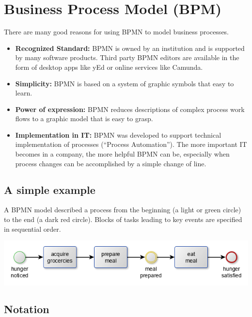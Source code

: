 \documentclass[]{book}
\providecommand{\tightlist}{%
  \setlength{\itemsep}{0pt}\setlength{\parskip}{0pt}}
\begin{document}
\hypertarget{business-process-model-bpm}{%
\section{Business Process Model (BPM)}\label{business-process-model-bpm}}

There are many good reasons for using BPMN to model business processes. \citep{Camunda2018a}

\begin{itemize}
\tightlist
\item
  \textbf{Recognized Standard:} BPMN is owned by an institution and is supported by many software products. Third party BPMN editors are available in the form of desktop apps like yEd \citep{YED2018} or online services like Camunda. \citep{Camunda2018b}
\item
  \textbf{Simplicity:} BPMN is based on a system of graphic symbols that easy to learn.
\item
  \textbf{Power of expression:} BPMN reduces descriptions of complex process work flows to a graphic model that is easy to grasp.
\item
  \textbf{Implementation in IT:} BPMN was developed to support technical implementation of processes (``Process Automation''). The more important IT becomes in a company, the more helpful BPMN can be, especially when process changes can be accomplished by a simple change of line.
\end{itemize}

\hypertarget{a-simple-example}{%
\subsection{A simple example}\label{a-simple-example}}

A BPMN model described a process from the beginning (a light or green circle) to the end (a dark red circle). Blocks of tasks leading to key events are specified in sequential order.

\includegraphics[width=1\linewidth]{images/simpleBPM}

\hypertarget{notation}{%
\subsection{Notation}\label{notation}}
\end{document}
